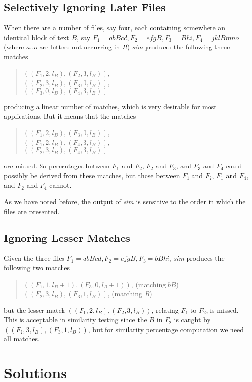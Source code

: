\documentclass[a4paper,fleqn]{article}
\renewcommand{\sim}[0]{{\it sim}}
\begin{document}
\subsection{Selectively Ignoring Later Files}

When there are a number of files, say four, each containing somewhere an
identical block of text $B$, say $F_1=abBcd,F_2=efgB,F_3=Bhi,F_4=jklBmno$
(where $a..o$ are letters not occurring in $B$)
{\sim} produces the following three matches
\begin{quote}
$((F_1,2,l_B),(F_2,3,l_B))$, \\
$((F_2,3,l_B),(F_3,0,l_B))$, \\
$((F_3,0,l_B),(F_4,3,l_B))$
\end{quote}
producing a linear number of matches, which is very desirable for most
applications.
But it means that the matches
\begin{quote}
$((F_1,2,l_B),(F_3,0,l_B))$, \\
$((F_1,2,l_B),(F_4,3,l_B))$, \\
$((F_2,3,l_B),(F_4,3,l_B))$
\end{quote}
are missed.
So percentages between $F_1$ and $F_2$, $F_2$ and $F_3$, and $F_3$ and $F_4$
could possibly be derived from these matches, but those between
$F_1$ and $F_2$, $F_1$ and $F_4$, and $F_2$ and $F_4$ cannot.

As we have noted before, the output of {\sim} is sensitive to the order in
which the files are presented.

\subsection{Ignoring Lesser Matches}

Given the three files $F_1=abBcd,F_2=efgB,F_3=bBhi$,
{\sim} produces the following two matches
\begin{quote}
$((F_1,1,l_B+1),(F_3,0,l_B+1))$, (matching $bB$) \\
$((F_2,3,l_B),(F_3,1,l_B))$, (matching $B$)
\end{quote}
but the lesser match $((F_1,2,l_B),(F_2,3,l_B))$, relating $F_1$ to $F_2$, is
missed.
This is acceptable in similarity testing since the $B$ in $F_2$ is caught by
$((F_2,3,l_B),(F_3,1,l_B))$, but for similarity percentage computation we need
all matches.

\section{Solutions}
\end{document}

